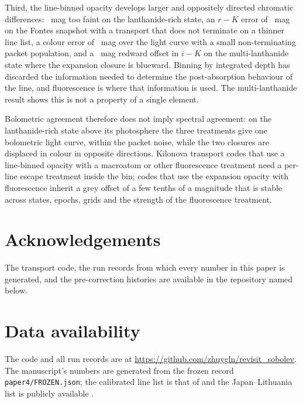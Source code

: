 \documentclass[fleqn,usenatbib]{mnras}
\begin{document}
Third, the line-binned opacity develops larger and oppositely directed chromatic differences: \BbinRtwoPone\ mag too faint on the lanthanide-rich state, an $r-K$ error of \FontesFluBbinRtwoRK\ mag on the Fontes snapshot with a transport that does not terminate on a thinner line list, a colour error of \LcBbintwoColour\ mag over the light curve with a small non-terminating packet population, and a \PxBbintwoIK\ mag redward offset in $i-K$ on the multi-lanthanide state where the expansion closure is blueward. Binning by integrated depth has discarded the information needed to determine the post-absorption behaviour of the line, and fluorescence is where that information is used. The multi-lanthanide result shows this is not a property of a single element.

Bolometric agreement therefore does not imply spectral agreement: on the lanthanide-rich state above its photosphere the three treatments give one bolometric light curve, within the packet noise, while the two closures are displaced in colour in opposite directions. Kilonova transport codes that use a line-binned opacity with a macroatom or other fluorescence treatment need a per-line escape treatment inside the bin; codes that use the expansion opacity with fluorescence inherit a grey offset of a few tenths of a magnitude that is stable across states, epochs, grids and the strength of the fluorescence treatment.

\section*{Acknowledgements}
The transport code, the run records from which every number in this paper is generated, and the pre-correction histories are available in the repository named below.

\section*{Data availability}
The code and all run records are at \url{https://github.com/zhuygln/revisit_sobolev}. The manuscript's numbers are generated from the frozen record \texttt{paper4/FROZEN.json}; the calibrated line list is that of \citet{gsi_atomic} and the Japan--Lithuania list is publicly available \citep{jplt2021}.




\label{lastpage}
\end{document}

